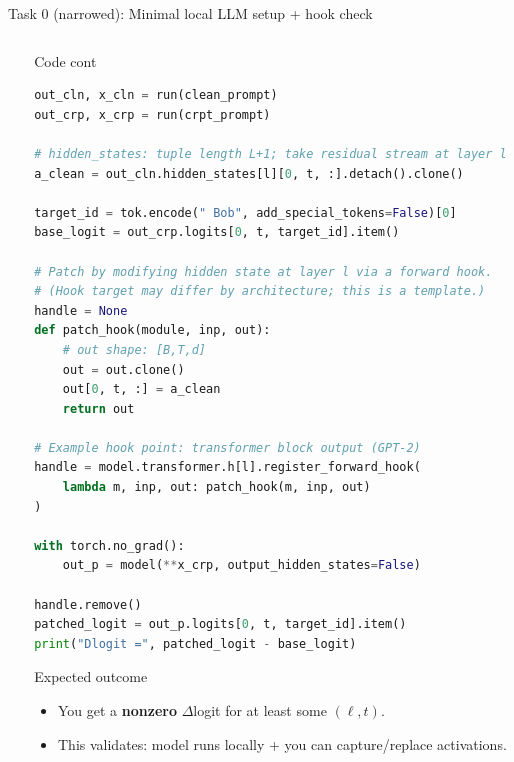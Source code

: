 \documentclass[aspectratio=169,xcolor={dvipsnames}]{beamer}
\renewcommand{\accent}[1]{\textbf{#1}}
\begin{document}
\begin{frame}[fragile,shrink=50]{Task 0 (narrowed): Minimal local LLM setup + hook check}
\begin{columns}[T,onlytextwidth]
\begin{column}{0.5\textwidth}
\end{column}

\begin{column}{0.48\textwidth}
\begin{block}{Code cont}
\footnotesize
\begin{lstlisting}[language=Python,basicstyle=\ttfamily\scriptsize]
out_cln, x_cln = run(clean_prompt)
out_crp, x_crp = run(crpt_prompt)

# hidden_states: tuple length L+1; take residual stream at layer l
a_clean = out_cln.hidden_states[l][0, t, :].detach().clone()

target_id = tok.encode(" Bob", add_special_tokens=False)[0]
base_logit = out_crp.logits[0, t, target_id].item()

# Patch by modifying hidden state at layer l via a forward hook.
# (Hook target may differ by architecture; this is a template.)
handle = None
def patch_hook(module, inp, out):
    # out shape: [B,T,d]
    out = out.clone()
    out[0, t, :] = a_clean
    return out

# Example hook point: transformer block output (GPT-2)
handle = model.transformer.h[l].register_forward_hook(
    lambda m, inp, out: patch_hook(m, inp, out)
)

with torch.no_grad():
    out_p = model(**x_crp, output_hidden_states=False)

handle.remove()
patched_logit = out_p.logits[0, t, target_id].item()
print("Dlogit =", patched_logit - base_logit)
\end{lstlisting}
\end{block}

\vspace{1mm}
\begin{block}{Expected outcome}
\footnotesize
\begin{itemize}\setlength\itemsep{2pt}
\item You get a \accent{nonzero} $\Delta$logit for at least some $(\ell,t)$.
\item This validates: model runs locally + you can capture/replace activations.
\end{itemize}
\end{block}
\end{column}
\end{columns}
\end{frame}
\end{document}
